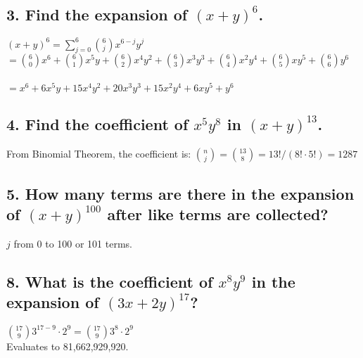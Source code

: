 \documentclass[11pt, oneside]{article} %
\numberwithin{equation}{section} %
\numberwithin{figure}{section} %
\numberwithin{table}{section} %
\begin{document}

\section{}
\subsection{3. Find the expansion of $(x + y )^6$.}
$(x + y )^6 = \sum\limits_{j=0}^6 {6 \choose j}x^{6-j}y^j  $\\
$= {6 \choose 0}x^6 + {6 \choose 1}x^5y + {6 \choose 2}x^4y^2 + {6 \choose 3}x^3y^3 + {6 \choose 4}x^2y^4 + {6 \choose 5}xy^5 + {6 \choose 6}y^6 $ \\\\
$= x^6 + 6x^5y + 15x^4y^2 + 20x^3y^3 + 15x^2y^4 + 6xy^5 + y^6$


\subsection{4. Find the coefficient of $x^5y^8$ in $(x + y)^{13}$.}
From Binomial Theorem, the coefficient is: ${n \choose j} = {13 \choose 8} = 13!/(8!\cdot 5!) = 1287 $


\subsection{5. How many terms are there in the expansion of $(x + y)^{100}$ after like terms are collected?}
$j$ from 0 to 100 or 101 terms. 


\subsection{8. What is the coefficient of $x^8y^9$ in the expansion of $(3x + 2y)^{17}$?}
${17 \choose 9} 3^{17-9} \cdot 2^9 = {17 \choose 9}3^8\cdot 2^9$ \\
Evaluates to 81,662,929,920. 
\end{document}
